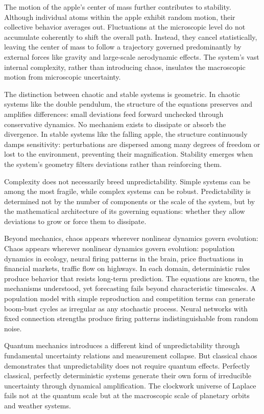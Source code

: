 The motion of the apple’s center of mass further contributes to stability. Although individual atoms within the apple exhibit random motion, their collective behavior averages out. Fluctuations at the microscopic level do not accumulate coherently to shift the overall path. Instead, they cancel statistically, leaving the center of mass to follow a trajectory governed predominantly by external forces like gravity and large-scale aerodynamic effects. The system's vast internal complexity, rather than introducing chaos, insulates the macroscopic motion from microscopic uncertainty.

The distinction between chaotic and stable systems is geometric. In chaotic systems like the double pendulum, the structure of the equations preserves and amplifies differences: small deviations feed forward unchecked through conservative dynamics. No mechanism exists to dissipate or absorb the divergence. In stable systems like the falling apple, the structure continuously damps sensitivity: perturbations are dispersed among many degrees of freedom or lost to the environment, preventing their magnification. Stability emerges when the system’s geometry filters deviations rather than reinforcing them.

Complexity does not necessarily breed unpredictability. Simple systems can be among the most fragile, while complex systems can be robust. Predictability is determined not by the number of components or the scale of the system, but by the mathematical architecture of its governing equations: whether they allow deviations to grow or force them to dissipate.

Beyond mechanics, chaos appears wherever nonlinear dynamics govern evolution: Chaos appears wherever nonlinear dynamics govern evolution: population dynamics in ecology, neural firing patterns in the brain, price fluctuations in financial markets, traffic flow on highways. In each domain, deterministic rules produce behavior that resists long-term prediction. The equations are known, the mechanisms understood, yet forecasting fails beyond characteristic timescales. A population model with simple reproduction and competition terms can generate boom-bust cycles as irregular as any stochastic process. Neural networks with fixed connection strengths produce firing patterns indistinguishable from random noise.

Quantum mechanics introduces a different kind of unpredictability through fundamental uncertainty relations and measurement collapse. But classical chaos demonstrates that unpredictability does not require quantum effects. Perfectly classical, perfectly deterministic systems generate their own form of irreducible uncertainty through dynamical amplification. The clockwork universe of Laplace fails not at the quantum scale but at the macroscopic scale of planetary orbits and weather systems.

